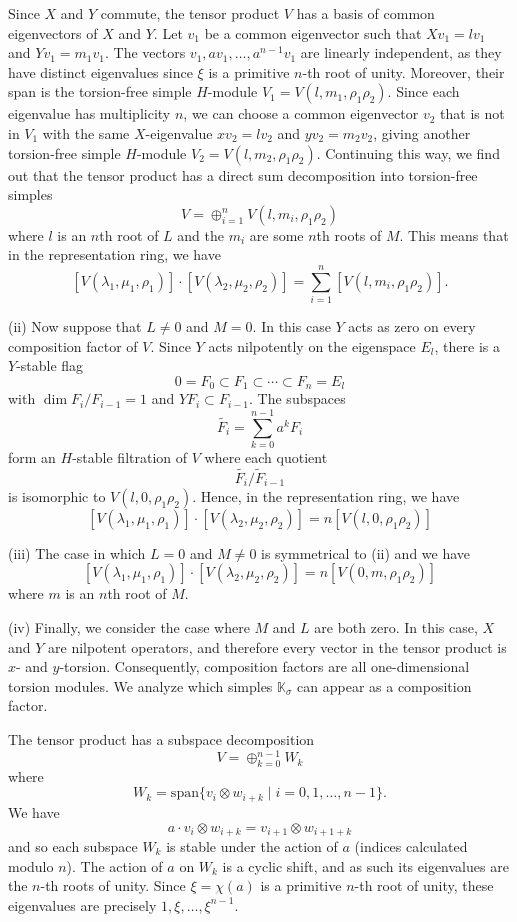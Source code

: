 \documentclass[11pt, twoside]{amsart}
\theoremstyle{definition}
\begin{document}
Since $X$ and $Y$ commute, the tensor product $V$ has a basis of common eigenvectors of $X$ and $Y$. Let $v_1$ be a common eigenvector such that $Xv_1 = l v_1$ and $Yv_1 = m_1 v_1$. The vectors $v_1, av_1, \ldots, a^{n-1}v_1$ are linearly independent, as they have distinct eigenvalues since $\xi$ is a primitive $n$-th root of unity. Moreover, their span is the torsion-free simple $H$-module $V_1 = V(l, m_1, \rho_1\rho_2)$. Since each eigenvalue has multiplicity $n$, we can choose a common eigenvector $v_2$ that is not in $V_1$ with the same $X$-eigenvalue $xv_2 = l v_2$ and $yv_2 = m_2 v_2$, giving another torsion-free simple $H$-module $V_2 = V(l, m_2, \rho_1\rho_2)$. Continuing this way, we find out that the tensor product has a direct sum decomposition into torsion-free simples
%
\[V = \oplus_{i=1}^{n}V(l, m_i, \rho_1\rho_2)\]
%
where $l$ is an $n$th root of $L$ and the $m_i$ are some $n$th roots of $M$. This means that in the representation ring, we have
%
\[[V(\lambda_1, \mu_1, \rho_1)]\cdot [V(\lambda_2, \mu_2, \rho_2)] = \sum_{i=1}^{n}[V(l,m_i,\rho_1\rho_2)].\]

(ii) Now suppose that $L \neq 0$ and $M = 0$. In this case $Y$ acts as zero on every composition factor of $V$. Since $Y$ acts nilpotently on the eigenspace $E_l$, there is a $Y$-stable flag 
%
\[0 = F_0 \subset F_1 \subset \cdots \subset F_n = E_l\]
%
with $\dim F_i / F_{i-1} = 1$ and $YF_i \subset F_{i-1}$. The subspaces 
%
\[\widetilde{F_i} = \sum_{k=0}^{n-1}a^k F_i\]
%
form an $H$-stable filtration of $V$ where each quotient
%
\[\widetilde{F_i}/\widetilde{F}_{i-1}\]
%
is isomorphic to $V(l, 0, \rho_1 \rho_2)$. Hence, in the representation ring, we have
%
\[[V(\lambda_1, \mu_1, \rho_1)]\cdot [V(\lambda_2, \mu_2, \rho_2)] = n[V(l, 0, \rho_1\rho_2)]\]

(iii) The case in which $L = 0$ and $M \neq 0$ is symmetrical to (ii) and we have 
%
\[[V(\lambda_1, \mu_1, \rho_1)]\cdot[V(\lambda_2, \mu_2, \rho_2)] = n[V(0, m, \rho_1\rho_2)]\]
%
where $m$ is an $n$th root of $M$.

(iv) Finally, we consider the case where $M$ and $L$ are both zero. In this case, $X$ and $Y$ are nilpotent operators, and therefore every vector in the tensor product is $x$- and $y$-torsion. Consequently, composition factors are all one-dimensional torsion modules. We analyze which simples $\mathbb{K}_\sigma$ can appear as a composition factor. 

The tensor product has a subspace decomposition
%
\[V = \oplus_{k=0}^{n-1}W_k\]
%
where 
%
\[W_k = \mathrm{span}\{v_i \otimes w_{i+k} \mid i = 0,1, \ldots, n-1\}.\]
%
We have
%
\[a\cdot v_i \otimes w_{i+k} = v_{i+1}\otimes w_{i+1+k}\]
%
and so each subspace $W_k$ is stable under the action of $a$ (indices calculated modulo $n$). The action of $a$ on $W_k$ is a cyclic shift, and as such its eigenvalues are the $n$-th roots of unity. Since $\xi = \chi(a)$ is a primitive $n$-th root of unity, these eigenvalues are precisely $1, \xi, \ldots, \xi^{n-1}$.
\end{document}
